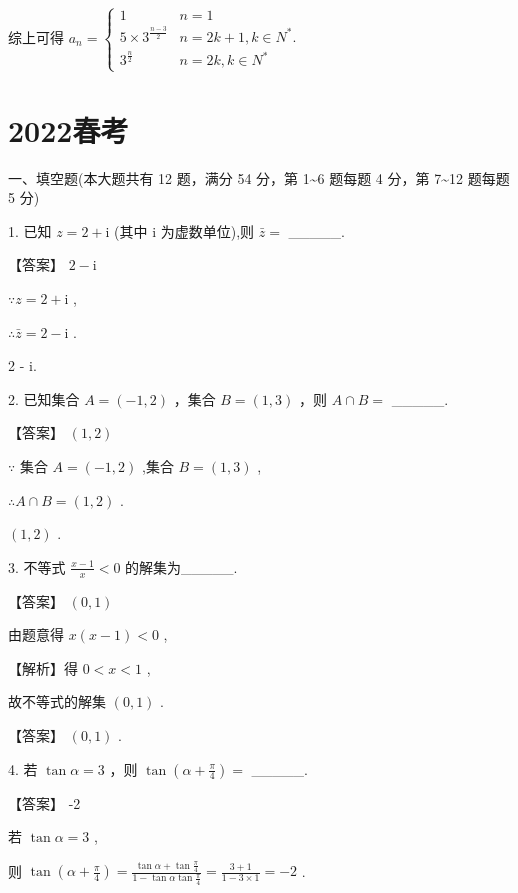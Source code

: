 \documentclass[10pt]{article}
\begin{document}
综上可得 \({a}_{n} = \left\{  \begin{matrix} 1 & n = 1 \\  5 \times  {3}^{\frac{n - 3}{2}} & n = {2k} + 1,k \in  {N}^{ * }. \\  {3}^{\frac{n}{2}} & n = {2k},k \in  {N}^{ * } \end{matrix}\right.\)

\section*{2022春考}

一、填空题(本大题共有 12 题，满分 54 分，第 1\textasciitilde 6 题每题 4 分，第 7\textasciitilde 12 题每题 5 分)

1. 已知 \(z = 2 + \mathrm{i}\) (其中 \(\mathrm{i}\) 为虚数单位),则 \(\bar{z} =\) \_\_\_\_\_.

【答案】 \(2 - \mathrm{i}\)

\(\because z = 2 + \mathrm{i}\) ,

\(\therefore \bar{z} = 2 - \mathrm{i}\) .

2 - i.

2. 已知集合 \(A = \left( {-1,2}\right)\) ，集合 \(B = \left( {1,3}\right)\) ，则 \(A \cap  B =\) \_\_\_\_\_.

【答案】 \(\left( {1,2}\right)\)

\(\because\) 集合 \(A = \left( {-1,2}\right)\) ,集合 \(B = \left( {1,3}\right)\) ,

\(\therefore A \cap  B = \left( {1,2}\right)\) .

\(\left( {1,2}\right)\) .

3. 不等式 \(\frac{x - 1}{x} < 0\) 的解集为\_\_\_\_\_.

【答案】 \(\left( {0,1}\right)\)

由题意得 \(x\left( {x - 1}\right)  < 0\) ,

【解析】得 \(0 < x < 1\) ,

故不等式的解集 \(\left( {0,1}\right)\) .

【答案】 \(\left( {0,1}\right)\) .

4. 若 \(\tan \alpha  = 3\) ，则 \(\tan \left( {\alpha  + \frac{\pi }{4}}\right)  =\) \_\_\_\_\_.

【答案】 -2

若 \(\tan \alpha  = 3\) ,

则 \(\tan \left( {\alpha  + \frac{\pi }{4}}\right)  = \frac{\tan \alpha  + \tan \frac{\pi }{4}}{1 - \tan \alpha \tan \frac{\pi }{4}} = \frac{3 + 1}{1 - 3 \times  1} =  - 2\) .
\end{document}
